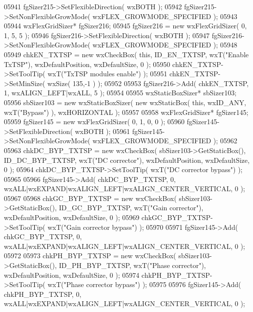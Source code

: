 \begin{DoxyCode}
05941     fgSizer215->SetFlexibleDirection( wxBOTH );
05942     fgSizer215->SetNonFlexibleGrowMode( wxFLEX\_GROWMODE\_SPECIFIED );
05943     
05944     wxFlexGridSizer* fgSizer216;
05945     fgSizer216 = \textcolor{keyword}{new} wxFlexGridSizer( 0, 1, 5, 5 );
05946     fgSizer216->SetFlexibleDirection( wxBOTH );
05947     fgSizer216->SetNonFlexibleGrowMode( wxFLEX\_GROWMODE\_SPECIFIED );
05948     
05949     chkEN_TXTSP = \textcolor{keyword}{new} wxCheckBox( \textcolor{keyword}{this}, ID_EN_TXTSP, wxT(\textcolor{stringliteral}{"Enable TxTSP"}), wxDefaultPosition, wxDefaultSize,
       0 );
05950     chkEN_TXTSP->SetToolTip( wxT(\textcolor{stringliteral}{"TxTSP modules enable"}) );
05951     chkEN_TXTSP->SetMinSize( wxSize( 135,-1 ) );
05952     
05953     fgSizer216->Add( chkEN_TXTSP, 1, wxALIGN\_LEFT|wxALL, 5 );
05954     
05955     wxStaticBoxSizer* sbSizer103;
05956     sbSizer103 = \textcolor{keyword}{new} wxStaticBoxSizer( \textcolor{keyword}{new} wxStaticBox( \textcolor{keyword}{this}, wxID\_ANY, wxT(\textcolor{stringliteral}{"Bypass"}) ), wxHORIZONTAL );
05957     
05958     wxFlexGridSizer* fgSizer145;
05959     fgSizer145 = \textcolor{keyword}{new} wxFlexGridSizer( 0, 1, 0, 0 );
05960     fgSizer145->SetFlexibleDirection( wxBOTH );
05961     fgSizer145->SetNonFlexibleGrowMode( wxFLEX\_GROWMODE\_SPECIFIED );
05962     
05963     chkDC_BYP_TXTSP = \textcolor{keyword}{new} wxCheckBox( sbSizer103->GetStaticBox(), 
      ID_DC_BYP_TXTSP, wxT(\textcolor{stringliteral}{"DC corrector"}), wxDefaultPosition, wxDefaultSize, 0 );
05964     chkDC_BYP_TXTSP->SetToolTip( wxT(\textcolor{stringliteral}{"DC corrector bypass"}) );
05965     
05966     fgSizer145->Add( chkDC_BYP_TXTSP, 0, wxALL|wxEXPAND|wxALIGN\_LEFT|wxALIGN\_CENTER\_VERTICAL, 0 );
05967     
05968     chkGC_BYP_TXTSP = \textcolor{keyword}{new} wxCheckBox( sbSizer103->GetStaticBox(), 
      ID_GC_BYP_TXTSP, wxT(\textcolor{stringliteral}{"Gain corrector"}), wxDefaultPosition, wxDefaultSize, 0 );
05969     chkGC_BYP_TXTSP->SetToolTip( wxT(\textcolor{stringliteral}{"Gain corrector bypass"}) );
05970     
05971     fgSizer145->Add( chkGC_BYP_TXTSP, 0, wxALL|wxEXPAND|wxALIGN\_LEFT|wxALIGN\_CENTER\_VERTICAL, 0 );
05972     
05973     chkPH_BYP_TXTSP = \textcolor{keyword}{new} wxCheckBox( sbSizer103->GetStaticBox(), 
      ID_PH_BYP_TXTSP, wxT(\textcolor{stringliteral}{"Phase corrector"}), wxDefaultPosition, wxDefaultSize, 0 );
05974     chkPH_BYP_TXTSP->SetToolTip( wxT(\textcolor{stringliteral}{"Phase corrector bypass"}) );
05975     
05976     fgSizer145->Add( chkPH_BYP_TXTSP, 0, wxALL|wxEXPAND|wxALIGN\_LEFT|wxALIGN\_CENTER\_VERTICAL, 0 );

\end{DoxyCode}
